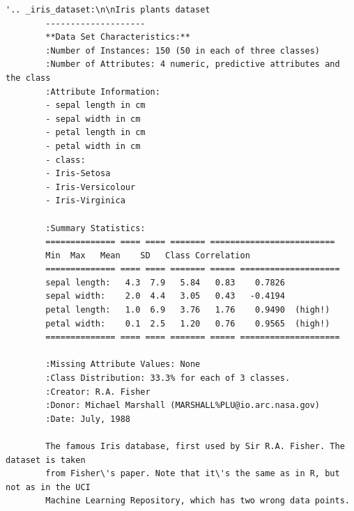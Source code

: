 \begin{code}
    \begin{lstlisting}[numbers=none]
        '.. _iris_dataset:\n\nIris plants dataset
        --------------------
        **Data Set Characteristics:**
        :Number of Instances: 150 (50 in each of three classes)
        :Number of Attributes: 4 numeric, predictive attributes and the class
        :Attribute Information:
        - sepal length in cm
        - sepal width in cm
        - petal length in cm
        - petal width in cm
        - class:
        - Iris-Setosa
        - Iris-Versicolour
        - Iris-Virginica
        
        :Summary Statistics:
        ============== ==== ==== ======= =========================
        Min  Max   Mean    SD   Class Correlation
        ============== ==== ==== ======= ===== ====================
        sepal length:   4.3  7.9   5.84   0.83    0.7826
        sepal width:    2.0  4.4   3.05   0.43   -0.4194
        petal length:   1.0  6.9   3.76   1.76    0.9490  (high!)
        petal width:    0.1  2.5   1.20   0.76    0.9565  (high!)
        ============== ==== ==== ======= ===== ====================
        
        :Missing Attribute Values: None
        :Class Distribution: 33.3% for each of 3 classes.
        :Creator: R.A. Fisher
        :Donor: Michael Marshall (MARSHALL%PLU@io.arc.nasa.gov)
        :Date: July, 1988
        
        The famous Iris database, first used by Sir R.A. Fisher. The dataset is taken
        from Fisher\'s paper. Note that it\'s the same as in R, but not as in the UCI
        Machine Learning Repository, which has two wrong data points.
        

\end{lstlisting}
\end{code}
